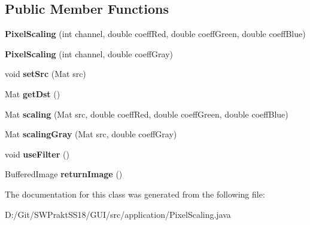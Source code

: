 \subsection*{Public Member Functions}
\begin{DoxyCompactItemize}
\item 
\mbox{\label{classapplication_1_1_pixel_scaling_a76804bd5b597ce7c618fc12278d04e2d}} 
{\bfseries Pixel\+Scaling} (int channel, double coeff\+Red, double coeff\+Green, double coeff\+Blue)
\item 
\mbox{\label{classapplication_1_1_pixel_scaling_a3b546e34add3de18aa023d6eba09ab46}} 
{\bfseries Pixel\+Scaling} (int channel, double coeff\+Gray)
\item 
\mbox{\label{classapplication_1_1_pixel_scaling_a914e29c7657e0f0f3eae8fb010e806de}} 
void {\bfseries set\+Src} (Mat src)
\item 
\mbox{\label{classapplication_1_1_pixel_scaling_a70c6b0584cd9040e725d5d6a35241c24}} 
Mat {\bfseries get\+Dst} ()
\item 
\mbox{\label{classapplication_1_1_pixel_scaling_aa83b84c670eed423d30f11a05b6d7483}} 
Mat {\bfseries scaling} (Mat src, double coeff\+Red, double coeff\+Green, double coeff\+Blue)
\item 
\mbox{\label{classapplication_1_1_pixel_scaling_ae640b52e22202114aa313f3f7307a8d1}} 
Mat {\bfseries scaling\+Gray} (Mat src, double coeff\+Gray)
\item 
\mbox{\label{classapplication_1_1_pixel_scaling_abfc9e53a7513c13355ee225845ca662e}} 
void {\bfseries use\+Filter} ()
\item 
\mbox{\label{classapplication_1_1_pixel_scaling_a3347a554b6d07689d65816372d89005f}} 
Buffered\+Image {\bfseries return\+Image} ()
\end{DoxyCompactItemize}


The documentation for this class was generated from the following file\+:\begin{DoxyCompactItemize}
\item 
D\+:/\+Git/\+S\+W\+Prakt\+S\+S18/\+G\+U\+I/src/application/Pixel\+Scaling.\+java\end{DoxyCompactItemize}
